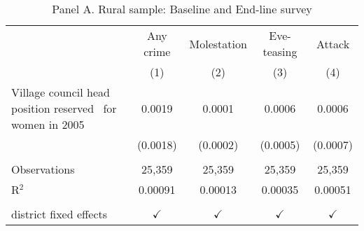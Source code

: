 
\begin{table}[htbp]
   \caption{Panel A. Rural sample: Baseline and End-line survey}
   \bigskip
   \centering
   \begin{tabular}{lcccc}
      \toprule
                                                                   & Any crime     & Molestation   & Eve-teasing   & Attack\\  
                                                                   & (1)           & (2)           & (3)           & (4)\\  
      \midrule 
       Village council head position reserved \ for women in 2005  & 0.0019        & 0.0001        & 0.0006        & 0.0006\\   
                                                                   & (0.0018)      & (0.0002)      & (0.0005)      & (0.0007)\\   
       \\
      Observations                                                 & 25,359        & 25,359        & 25,359        & 25,359\\  
      R$^2$                                                        & 0.00091       & 0.00013       & 0.00035       & 0.00051\\  
       \\
      district fixed effects                                       & $\checkmark$  & $\checkmark$  & $\checkmark$  & $\checkmark$\\   
      \bottomrule
   \end{tabular}
\end{table}



